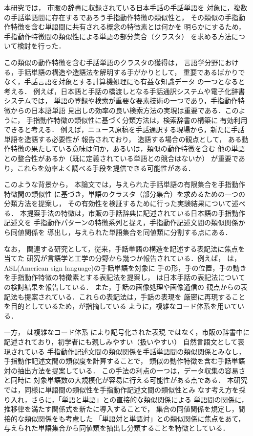 本研究では，
市販の辞書に収録されている日本手話の手話単語を
対象に，複数の手話単語間に存在するであろう手指動作特徴の類似性と，
その類似の手指動作特徴を含む単語間に共有される概念の特徴素とは何かを
明らかにするため，手指動作特徴間の類似性による単語の部分集合（クラスタ）
を求める方法について検討を行った．

この類似の動作特徴を含む手話単語のクラスタの獲得は，
言語学分野における，手話単語の構造や造語法を解明する手がかりとして，
重要であるばかりでなく，手話言語を対象とする計算機処理にも有益な知識データ
の一つとなると考える．
例えば，日本語と手話の橋渡しとなる手話通訳システムや電子化辞書システムでは，
単語の登録や検索が重要な要素技術の一つであり，手指動作特徴からの日本語単語
見出しの効率の良い検索方法の実現は重要である．このように，
手指動作特徴の類似性に基づく分類方法は，検索辞書の構築に
有効利用できると考える．
例えば，ニュース原稿を手話通訳する現場から，新たに手話単語を造語する必要性が
報告\cite{Shigaki1991}されており，
造語する場合の観点として，
ある動作特徴の果たしている意味は何か，あるいは，類似の動作特徴を含む
他の単語との整合性があるか（既に定義されている単語との競合はないか）
が重要であり，これらを効率よく調べる手段を提供できる可能性がある．

このような背景から，
本論文では，与えられた手話単語の有限集合を手指動作特徴間の類似性
に基づき，単語のクラスタ（部分集合）を求めるための一つの分類方法を提案し，
その有効性を検証するために行った実験結果について述べる．
本提案手法の特徴は，市販の手話辞典に記述されている日本語の手指動作記述文を
手指動作パターンの特徴系列と捉え，手指動作記述文間の類似関係から同値関係を
導出し，与えられた単語集合を同値類に分割する点にある．

なお，
関連する研究として，従来，手話単語の構造を記述する表記法に焦点を当てた
研究が言語学と工学の分野から幾つか報告されている．例えば，
\cite{Stokoe1976}は，ASL(American sign language)の手話単語を対象に
手の形，手の位置，手の動きを手指動作特徴の特徴素とする表記法を提案し，
\cite{Kanda1984,Kanda1985}は日本手話の表記法についての検討結果を報告している．
また，手話の画像処理\cite{Kamata1991}や画像通信\cite{JunXU1993}の
観点からの表記法も提案されている．これらの表記法は，手話の表現を
厳密に再現することを目的としているため，\cite{Naitou1996}が指摘している
ように，複雑なコード体系を用いている．

一方，
\cite{Adachi2000}は複雑なコード体系
により記号化された表現
ではなく，市販の辞書中に記述されており，初学者にも親しみやすい（扱いやすい）
自然言語文として表現されている
手指動作記述文間の類似関係を手話単語間の類似関係とみなし，
手指動作記述文間の類似度を計算することで，
類似の動作特徴を含む手話単語対の抽出方法を提案している．
この手法の利点の一つは，データ収集の容易さと同時に
対象単語数の大規模化が容易に行える可能性がある点である．
本研究では，同様に単語間の類似性を手指動作記述文間の類似性とみ
なす考え方を採り入れ，さらに，「単語と単語」との直接的な類似関係による
単語間の関係に，推移律を満たす関係式を新たに導入することで，
集合の同値関係を規定し，間接的な類似関係をも考慮した
「単語対と単語対」との類似関係に焦点をあて，与えられた単語集合から同値類を抽出し分類することを特徴としている．

